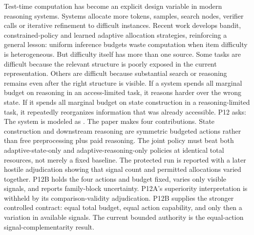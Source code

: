 \markdownRendererDocumentBegin
\markdownRendererSectionBegin
{}\markdownRendererInterblockSeparator
{}Test-time computation has become an explicit design variable in modern reasoning systems. Systems allocate more tokens, samples, search nodes, verifier calls or iterative refinement to difficult instances. Recent work develops bandit, constrained-policy and learned adaptive allocation strategies, reinforcing a general lesson: uniform inference budgets waste computation when item difficulty is heterogeneous.\markdownRendererInterblockSeparator
{}But difficulty itself has more than one source. Some tasks are difficult because the relevant structure is poorly exposed in the current representation. Others are difficult because substantial search or reasoning remains even after the right structure is visible. If a system spends all marginal budget on reasoning in an access-limited task, it reasons harder over the wrong state. If it spends all marginal budget on state construction in a reasoning-limited task, it repeatedly reorganizes information that was already accessible.\markdownRendererInterblockSeparator
{}P12 asks:\markdownRendererInterblockSeparator
{}\markdownRendererBlockQuoteBegin
{}
\markdownRendererBlockQuoteEnd \markdownRendererInterblockSeparator
{}The system is modeled as\markdownRendererInterblockSeparator
{}.\markdownRendererInterblockSeparator
{}The paper makes four contributions.\markdownRendererInterblockSeparator
{}\markdownRendererOlBeginTight
{} State construction and downstream reasoning are symmetric budgeted actions rather than free preprocessing plus paid reasoning.\markdownRendererOlItemEnd
{} The joint policy must beat both adaptive-state-only and adaptive-reasoning-only policies at identical total resources, not merely a fixed baseline.\markdownRendererOlItemEnd
{} The protected run is reported with a later hostile adjudication showing that signal count and permitted allocations varied together.\markdownRendererOlItemEnd
{} P12B holds the four actions and budget fixed, varies only visible signals, and reports family-block uncertainty.\markdownRendererOlItemEnd
\markdownRendererOlEndTight \markdownRendererInterblockSeparator
{}P12A's superiority interpretation is withheld by its comparison-validity adjudication. P12B supplies the stronger controlled contract: equal total budget, equal action capability, and only then a variation in available signals. The current bounded authority is the equal-action signal-complementarity result.
\markdownRendererSectionEnd \markdownRendererDocumentEnd